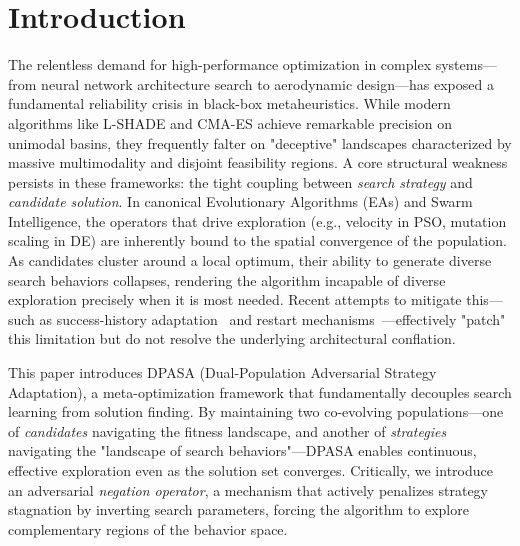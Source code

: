 \documentclass[11pt]{article}
\begin{document}
\section{Introduction}

The relentless demand for high-performance optimization in complex systems---from neural network architecture search to aerodynamic design---has exposed a fundamental reliability crisis in black-box metaheuristics. While modern algorithms like L-SHADE and CMA-ES achieve remarkable precision on unimodal basins, they frequently falter on "deceptive" landscapes characterized by massive multimodality and disjoint feasibility regions. A core structural weakness persists in these frameworks: the tight coupling between \textit{search strategy} and \textit{candidate solution}. In canonical Evolutionary Algorithms (EAs) and Swarm Intelligence, the operators that drive exploration (e.g., velocity in PSO, mutation scaling in DE) are inherently bound to the spatial convergence of the population. As candidates cluster around a local optimum, their ability to generate diverse search behaviors collapses, rendering the algorithm incapable of diverse exploration precisely when it is most needed. Recent attempts to mitigate this---such as success-history adaptation~\citep{tanabe2013shade} and restart mechanisms~\citep{stanovov2024lsrtde}---effectively "patch" this limitation but do not resolve the underlying architectural conflation.

This paper introduces DPASA (Dual-Population Adversarial Strategy Adaptation), a meta-optimization framework that fundamentally decouples search learning from solution finding. By maintaining two co-evolving populations---one of \textit{candidates} navigating the fitness landscape, and another of \textit{strategies} navigating the "landscape of search behaviors"---DPASA enables continuous, effective exploration even as the solution set converges. Critically, we introduce an adversarial \textit{negation operator}, a mechanism that actively penalizes strategy stagnation by inverting search parameters, forcing the algorithm to explore complementary regions of the behavior space.
\end{document}
